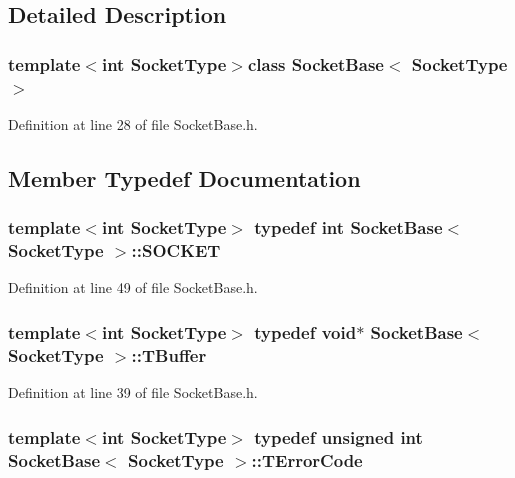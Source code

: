 \subsection{Detailed Description}
\subsubsection*{template$<$int Socket\-Type$>$class Socket\-Base$<$ Socket\-Type $>$}



Definition at line 28 of file Socket\-Base.\-h.



\subsection{Member Typedef Documentation}
\hypertarget{class_socket_base_aa1bd9ff0bcf59292806575e0abbe3829}{
\subsubsection[{S\-O\-C\-K\-E\-T}]{\setlength{\rightskip}{0pt plus 5cm}template$<$int Socket\-Type$>$ typedef int {\bf Socket\-Base}$<$ Socket\-Type $>$\-::{\bf S\-O\-C\-K\-E\-T}\hspace{0.3cm}{\ttfamily [protected]}}}\label{class_socket_base_aa1bd9ff0bcf59292806575e0abbe3829}


Definition at line 49 of file Socket\-Base.\-h.

\hypertarget{class_socket_base_a1557d64029a25c20b4c306b80efcc143}{
\subsubsection[{T\-Buffer}]{\setlength{\rightskip}{0pt plus 5cm}template$<$int Socket\-Type$>$ typedef void$\ast$ {\bf Socket\-Base}$<$ Socket\-Type $>$\-::{\bf T\-Buffer}}}\label{class_socket_base_a1557d64029a25c20b4c306b80efcc143}


Definition at line 39 of file Socket\-Base.\-h.

\hypertarget{class_socket_base_a8feec23168739e87c6ccb7fa8c64ac11}{
\subsubsection[{T\-Error\-Code}]{\setlength{\rightskip}{0pt plus 5cm}template$<$int Socket\-Type$>$ typedef unsigned int {\bf Socket\-Base}$<$ Socket\-Type $>$\-::{\bf T\-Error\-Code}}}\label{class_socket_base_a8feec23168739e87c6ccb7fa8c64ac11}



